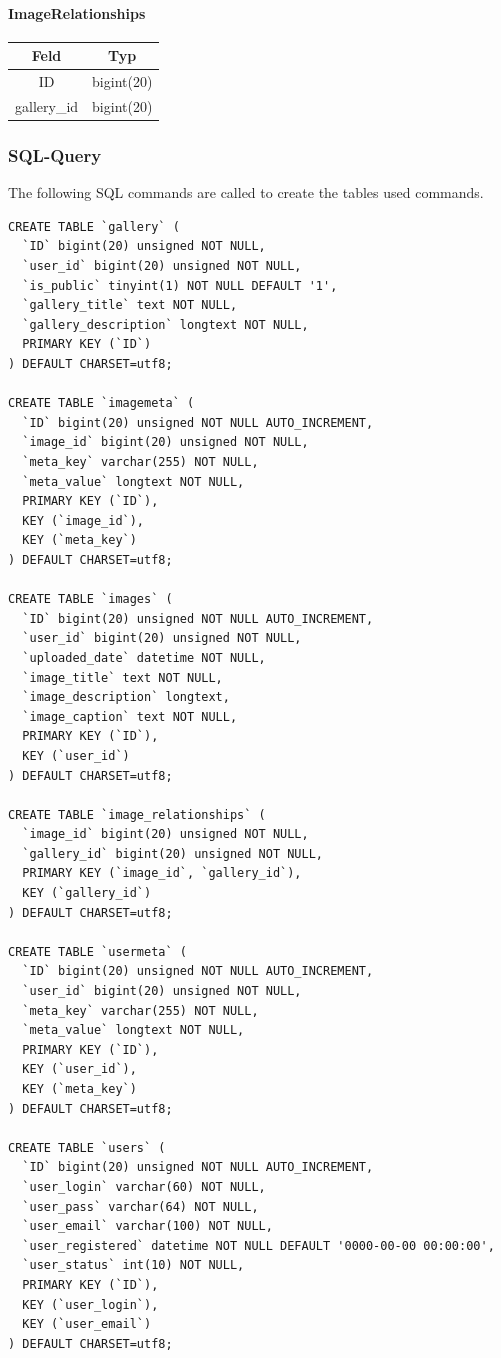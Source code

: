\documentclass[a4paper,12pt,oneside]{article} %
\begin{document}
\paragraph*{ImageRelationships}

\begin{tabular}{|c|c|}
\hline 
Feld & Typ\tabularnewline
\hline 
\hline 
ID & bigint(20)\tabularnewline
\hline 
gallery\_id & bigint(20)\tabularnewline
\end{tabular}

\subsubsection{SQL-Query}

The following SQL commands are called to create the tables used commands.

\begin{lstlisting}
CREATE TABLE `gallery` (
  `ID` bigint(20) unsigned NOT NULL,
  `user_id` bigint(20) unsigned NOT NULL,
  `is_public` tinyint(1) NOT NULL DEFAULT '1',
  `gallery_title` text NOT NULL,
  `gallery_description` longtext NOT NULL,
  PRIMARY KEY (`ID`)
) DEFAULT CHARSET=utf8;

CREATE TABLE `imagemeta` (
  `ID` bigint(20) unsigned NOT NULL AUTO_INCREMENT,
  `image_id` bigint(20) unsigned NOT NULL,
  `meta_key` varchar(255) NOT NULL,
  `meta_value` longtext NOT NULL,
  PRIMARY KEY (`ID`),
  KEY (`image_id`),
  KEY (`meta_key`)
) DEFAULT CHARSET=utf8;

CREATE TABLE `images` (
  `ID` bigint(20) unsigned NOT NULL AUTO_INCREMENT,
  `user_id` bigint(20) unsigned NOT NULL,
  `uploaded_date` datetime NOT NULL,
  `image_title` text NOT NULL,
  `image_description` longtext,
  `image_caption` text NOT NULL,
  PRIMARY KEY (`ID`),
  KEY (`user_id`)
) DEFAULT CHARSET=utf8;

CREATE TABLE `image_relationships` (
  `image_id` bigint(20) unsigned NOT NULL,
  `gallery_id` bigint(20) unsigned NOT NULL,
  PRIMARY KEY (`image_id`, `gallery_id`),
  KEY (`gallery_id`)
) DEFAULT CHARSET=utf8;

CREATE TABLE `usermeta` (
  `ID` bigint(20) unsigned NOT NULL AUTO_INCREMENT,
  `user_id` bigint(20) unsigned NOT NULL,
  `meta_key` varchar(255) NOT NULL,
  `meta_value` longtext NOT NULL,
  PRIMARY KEY (`ID`),
  KEY (`user_id`),
  KEY (`meta_key`)
) DEFAULT CHARSET=utf8;

CREATE TABLE `users` (
  `ID` bigint(20) unsigned NOT NULL AUTO_INCREMENT,
  `user_login` varchar(60) NOT NULL,
  `user_pass` varchar(64) NOT NULL,
  `user_email` varchar(100) NOT NULL,
  `user_registered` datetime NOT NULL DEFAULT '0000-00-00 00:00:00',
  `user_status` int(10) NOT NULL,
  PRIMARY KEY (`ID`),
  KEY (`user_login`),
  KEY (`user_email`)
) DEFAULT CHARSET=utf8;
\end{lstlisting}
\end{document}
